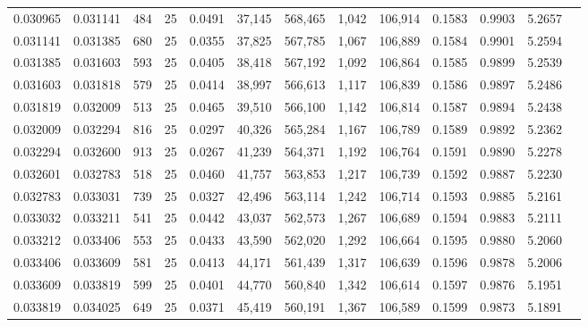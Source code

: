 \begin{tabular}{rrrrrrrrrrrrr}
0.030965 & 0.031141 &   484 &  25 &                                     0.0491 &  37,145 & 568,465 &   1,042 & 106,914 & 0.1583 & 0.9903 & 5.2657 \\
0.031141 & 0.031385 &   680 &  25 &                                     0.0355 &  37,825 & 567,785 &   1,067 & 106,889 & 0.1584 & 0.9901 & 5.2594 \\
0.031385 & 0.031603 &   593 &  25 &                                     0.0405 &  38,418 & 567,192 &   1,092 & 106,864 & 0.1585 & 0.9899 & 5.2539 \\
0.031603 & 0.031818 &   579 &  25 &                                     0.0414 &  38,997 & 566,613 &   1,117 & 106,839 & 0.1586 & 0.9897 & 5.2486 \\
0.031819 & 0.032009 &   513 &  25 &                                     0.0465 &  39,510 & 566,100 &   1,142 & 106,814 & 0.1587 & 0.9894 & 5.2438 \\
0.032009 & 0.032294 &   816 &  25 &                                     0.0297 &  40,326 & 565,284 &   1,167 & 106,789 & 0.1589 & 0.9892 & 5.2362 \\
0.032294 & 0.032600 &   913 &  25 &                                     0.0267 &  41,239 & 564,371 &   1,192 & 106,764 & 0.1591 & 0.9890 & 5.2278 \\
0.032601 & 0.032783 &   518 &  25 &                                     0.0460 &  41,757 & 563,853 &   1,217 & 106,739 & 0.1592 & 0.9887 & 5.2230 \\
0.032783 & 0.033031 &   739 &  25 &                                     0.0327 &  42,496 & 563,114 &   1,242 & 106,714 & 0.1593 & 0.9885 & 5.2161 \\
0.033032 & 0.033211 &   541 &  25 &                                     0.0442 &  43,037 & 562,573 &   1,267 & 106,689 & 0.1594 & 0.9883 & 5.2111 \\
0.033212 & 0.033406 &   553 &  25 &                                     0.0433 &  43,590 & 562,020 &   1,292 & 106,664 & 0.1595 & 0.9880 & 5.2060 \\
0.033406 & 0.033609 &   581 &  25 &                                     0.0413 &  44,171 & 561,439 &   1,317 & 106,639 & 0.1596 & 0.9878 & 5.2006 \\
0.033609 & 0.033819 &   599 &  25 &                                     0.0401 &  44,770 & 560,840 &   1,342 & 106,614 & 0.1597 & 0.9876 & 5.1951 \\
0.033819 & 0.034025 &   649 &  25 &                                     0.0371 &  45,419 & 560,191 &   1,367 & 106,589 & 0.1599 & 0.9873 & 5.1891 \\

\end{tabular}

